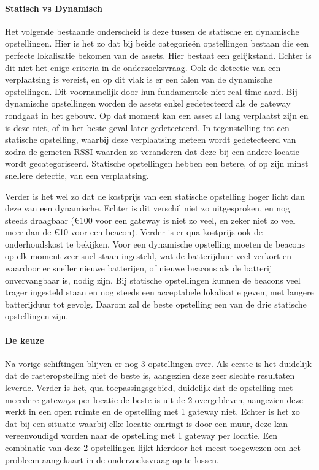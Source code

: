 \paragraph{Statisch vs Dynamisch}
Het volgende bestaande onderscheid is deze tussen de statische en dynamische opstellingen. Hier is het zo dat bij beide categorieën opstellingen bestaan die een perfecte lokalisatie bekomen van de assets. Hier bestaat een gelijkstand. Echter is dit niet het enige criteria in de onderzoeksvraag. Ook de detectie van een verplaatsing is vereist, en op dit vlak is er een falen van de dynamische opstellingen. Dit voornamelijk door hun fundamentele niet real-time aard. Bij dynamische opstellingen worden de assets enkel gedetecteerd als de gateway rondgaat in het gebouw. Op dat moment kan een asset al lang verplaatst zijn en is deze niet, of in het beste geval later gedetecteerd. In tegenstelling tot een statische opstelling, waarbij deze verplaatsing meteen wordt gedetecteerd van zodra de gemeten RSSI waarden zo veranderen dat deze bij een andere locatie wordt gecategoriseerd. Statische opstellingen hebben een betere, of op zijn minst snellere detectie, van een verplaatsing. 

Verder is het wel zo dat de kostprijs van een statische opstelling hoger licht dan deze van een dynamische. Echter is dit verschil niet zo uitgesproken, en nog steeds draagbaar (€100 voor een gateway is niet zo veel, en zeker niet zo veel meer dan de €10 voor een beacon). Verder is er qua kostprijs ook de onderhoudskost te bekijken. Voor een dynamische opstelling moeten de beacons op elk moment zeer snel staan ingesteld, wat de batterijduur veel verkort en waardoor er sneller nieuwe batterijen, of nieuwe beacons als de batterij onvervangbaar is, nodig zijn. Bij statische opstellingen kunnen de beacons veel trager ingesteld staan en nog steeds een acceptabele lokalisatie geven, met langere batterijduur tot gevolg. Daarom zal de beste opstelling een van de drie statische opstellingen zijn.

\paragraph{De keuze}
Na vorige schiftingen blijven er nog 3 opstellingen over. Als eerste is het duidelijk dat de rasteropstelling niet de beste is, aangezien deze zeer slechte resultaten leverde. Verder is het, qua toepassingsgebied, duidelijk dat de opstelling met meerdere gateways per locatie de beste is uit de 2 overgebleven, aangezien deze werkt in een open ruimte en de opstelling met 1 gateway niet. Echter is het zo dat bij een situatie waarbij elke locatie omringt is door een muur, deze kan vereenvoudigd worden naar de opstelling met 1 gateway per locatie. Een combinatie van deze 2 opstellingen lijkt hierdoor het meest toegewezen om het probleem aangekaart in de onderzoeksvraag op te lossen.

